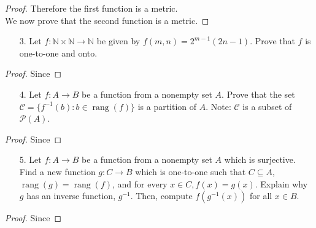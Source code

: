 \documentclass[10pt]{article}
\theoremstyle{definition}
\theoremstyle{plain}
\newcommand{\N}{\mathbb{N}}
\DeclareMathOperator\rang{rang}
\begin{document}
\begin{proof}
  Therefore the first function is a metric. \\

  We now prove that the second function is a metric.
\end{proof}



\pagebreak



\begin{enumerate}
\item[3.] Let $f: \N \times \N \to \N$ be given by $f(m,n) = 2^{m-1}(2n-1)$.  Prove that $f$ is one-to-one and onto.
\end{enumerate}



\begin{proof}
  Since
\end{proof}



\pagebreak



\begin{enumerate}
\item[4.] Let $f:A \to B$ be a function from a nonempty set $A$.  Prove that the set $ \mathcal{C} = \{f^{-1}(b): b \in \rang(f)\}$ is a partition of $A$.  Note:  $\mathcal{C}$ is a subset of $\mathscr{P}(A)$.
\end{enumerate}



\begin{proof}
  Since
\end{proof}



\pagebreak



\begin{enumerate}
\item[5.] Let $f:A \to B$ be a function from a nonempty set $A$ which is surjective.  Find a new function $g:C \to B$ which is one-to-one such that $C \subseteq A$, $\rang(g) = \rang(f)$, and for every $x \in C, f(x) = g(x)$.  Explain why $g$ has an inverse function, $g^{-1}$.  Then, compute $f(g^{-1}(x))$ for all $x \in B$.
\end{enumerate}



\begin{proof}
  Since
\end{proof}
\end{document}
